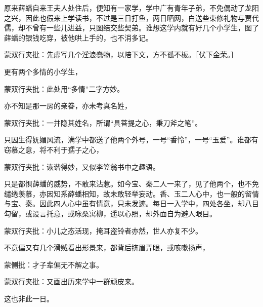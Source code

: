 \begin{parag}


    原来薛蟠自来王夫人处住后，便知有一家学，学中广有青年子弟，不免偶动了龙阳之兴，因此也假来上学读书，不过是三日打鱼，两日晒网，白送些束修礼物与贾代儒，却不曾有一些儿进益，只图结交些契弟。谁想这学内就有好几个小学生，图了薛蟠的银钱吃穿，被他哄上手的，也不消多记。\begin{note}蒙双行夹批：先虚写几个淫浪蠢物，以陪下文，方不孤不板。［伏下金荣。］\end{note}更有两个多情的小学生，\begin{note}蒙双行夹批：此处用“多情”二字方妙。\end{note}亦不知是那一房的亲眷，亦未考真名姓，\begin{note}蒙双行夹批：一并隐其姓名，所谓“具菩提之心，秉刀斧之笔”。\end{note}只因生得妩媚风流，满学中都送了他两个外号，一号“香怜”，一号“玉爱”。谁都有窃慕之意，将不利于孺子之心，\begin{note}蒙双行夹批：诙谐得妙，又似李笠翁书中之趣语。\end{note}只是都惧薛蟠的威势，不敢来沾惹。如今宝、秦二人一来了，见了他两个，也不免缱绻羡慕，亦因知系薛蟠相知，故未敢轻举妄动。香、玉二人心中，也一般的留情与宝、秦。因此四人心中虽有情意，只未发迹。每日一入学中，四处各坐，却八目勾留，或设言托意，或咏桑寓柳，遥以心照，却外面自为避人眼目。\begin{note}蒙双行夹批：小儿之态活现，掩耳盗铃者亦然，世人亦复不少。\end{note}不意偏又有几个滑贼看出形景来，都背后挤眉弄眼，或咳嗽扬声，\begin{note}蒙侧批：才子辈偏无不解之事。\end{note}\begin{note}蒙双行夹批：又画出历来学中一群顽皮来。\end{note}这也非此一日。
\end{parag}


